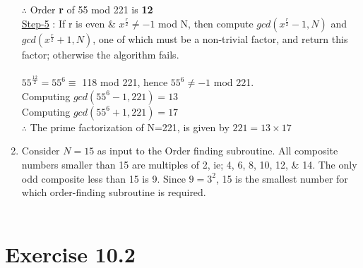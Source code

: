 \documentclass[a4paper,12pt]{article}
\begin{document}
\begin{enumerate}[label=(\alph*)]
$\therefore $ Order \textbf{r} of 55 mod 221 is \textbf{12}\\
\underline{Step-5} : If r is even \& $x^{\frac{r}{2}} \neq -1$ mod N, then compute $gcd(x^{\frac{r}{2}}-1, N)$ and $gcd(x^{\frac{r}{2}}+1, N)$, one of which must be a non-trivial factor, and return this factor; otherwise the algorithm fails. \\~\\
$55^{\frac{12}{2}} = 55^6 \equiv$ 118 mod 221, hence $55^6 \neq -1$ mod 221. \\
Computing $gcd(55^6-1, 221)= 13$ \\
Computing $gcd(55^6+1, 221)= 17$ \\
$\therefore $ The prime factorization of N=221, is given by $221=13\times 17$ \\
\item Consider $N=15$ as input to the Order finding subroutine. All composite numbers smaller than 15 are multiples of 2, ie; 4, 6, 8, 10, 12, \& 14. The only odd composite less than 15 is 9. Since $9=3^2$, 15 is the smallest number for which order-finding subroutine is required. \\~\\ 
\end{enumerate}

\section*{Exercise 10.2}
\end{document}
